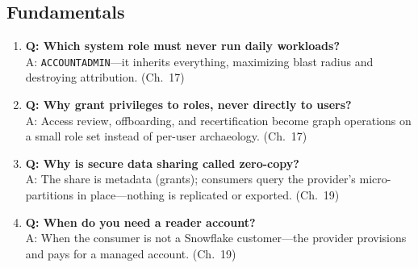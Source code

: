 \subsection{Fundamentals}
\begin{enumerate}
    \item \textbf{Q: Which system role must never run daily workloads?}\\
    A: \texttt{ACCOUNTADMIN}---it inherits everything, maximizing blast radius and destroying attribution. (Ch.~17)
    \item \textbf{Q: Why grant privileges to roles, never directly to users?}\\
    A: Access review, offboarding, and recertification become graph operations on a small role set instead of per-user archaeology. (Ch.~17)
    \item \textbf{Q: Why is secure data sharing called zero-copy?}\\
    A: The share is metadata (grants); consumers query the provider's micro-partitions in place---nothing is replicated or exported. (Ch.~19)
    \item \textbf{Q: When do you need a reader account?}\\
    A: When the consumer is not a Snowflake customer---the provider provisions and pays for a managed account. (Ch.~19)
\end{enumerate}

